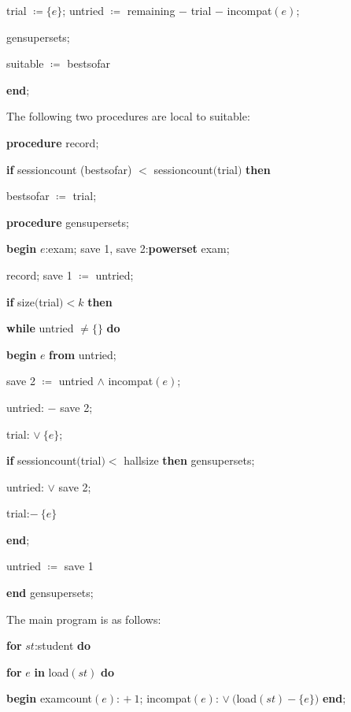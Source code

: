 \quad \quad trial $\coloneq \{e\}$; untried $\coloneq$ remaining $-$ trial $-$ incompat$(e)$;

\quad \quad gensupersets;

\quad \quad suitable $\coloneq$ bestsofar

\quad \textbf{end};

\noindent
The following two procedures are local to suitable:

\quad \textbf{procedure} record;

\quad \quad \textbf{if} sessioncount (bestsofar) $<$ sessioncount$($trial$)$ \textbf{then} 

\quad \quad \quad bestsofar $\coloneq$ trial;

\quad \textbf{procedure} gensupersets;

\quad \quad \textbf{begin} $e$:exam; save 1, save 2:\textbf{powerset} exam;

\quad \quad \quad record; save 1 $\coloneq$ untried;

\quad \quad \quad \textbf{if} size$($trial$) < k$ \textbf{then}

\quad \quad \quad \quad \textbf{while} untried $\neq \{\}$ \textbf{do}

\quad \quad \quad \quad \quad \textbf{begin} $e$ \textbf{from} untried;

\quad \quad \quad \quad \quad \quad save 2 $\coloneq$ untried $\wedge$ incompat$(e)$;

\quad \quad \quad \quad \quad \quad untried: $-$ save 2;

\quad \quad \quad \quad \quad \quad trial: $\vee\ \{e\}$;

\quad \quad \quad \quad \quad \quad \textbf{if} sessioncount$($trial$) <$ hallsize \textbf{then} gensupersets;

\quad \quad \quad \quad \quad \quad untried: $\vee$ save 2;

\quad \quad \quad \quad \quad \quad trial:$-\ \{e\}$

\quad \quad \quad \quad \quad \textbf{end};

\quad \quad \quad \quad untried $\coloneq$ save 1

\quad \textbf{end} gensupersets;

\noindent
The main program is as follows:

\quad \textbf{for} $st$:student \textbf{do}

\quad \quad \textbf{for} $e$ \textbf{in} load$(st)$ \textbf{do}

\quad \quad \quad \textbf{begin} examcount$(e)$: $+\ 1$; incompat$(e)$: $\vee\ ($load$(st) - \{e\})$ \textbf{end};


